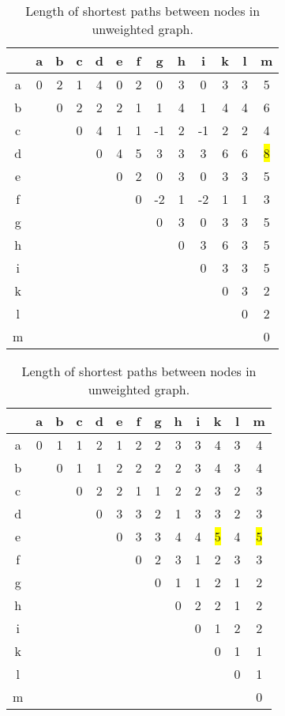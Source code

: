 \documentclass[a4paper,onecolumn,oneside]{article}
\begin{document}
\begin{table}
\begin{subtable}
\centering
\begin{tabular}{c || c c c c c c c c c c c c}
 & a& b& c& d& e& f& g& h& i& k& l& m\\
\hline \hline
a& 0& 2& 1& 4& 0& 2& 0& 3& 0& 3& 3& 5\\
b&  & 0& 2& 2& 2& 1& 1& 4& 1& 4& 4& 6\\
c&  &  & 0& 4& 1& 1&-1& 2&-1& 2& 2& 4\\
d&  &  &  & 0& 4& 5& 3& 3& 3& 6& 6& \colorbox{yellow}{8}\\
e&  &  &  &  & 0& 2& 0& 3& 0& 3& 3& 5\\
f&  &  &  &  &  & 0&-2& 1&-2& 1& 1& 3\\
g&  &  &  &  &  &  & 0& 3& 0& 3& 3& 5\\
h&  &  &  &  &  &  &  & 0& 3& 6& 3& 5\\
i&  &  &  &  &  &  &  &  & 0& 3& 3& 5\\
k&  &  &  &  &  &  &  &  &  & 0& 3& 2\\
l&  &  &  &  &  &  &  &  &  &  & 0& 2\\
m&  &  &  &  &  &  &  &  &  &  &  & 0\\
\end{tabular}
\caption{Length of shortest paths between nodes in weighted graph.}
\label{tbl:weighted-paths}
\end{subtable}
\qquad

\begin{subtable}
\centering
\begin{tabular}{c || c c c c c c c c c c c c}
 & a& b& c& d& e& f& g& h& i& k& l& m\\
\hline \hline
a& 0& 1& 1& 2& 1& 2& 2& 3& 3& 4& 3& 4\\
b&  & 0& 1& 1& 2& 2& 2& 2& 3& 4& 3& 4\\
c&  &  & 0& 2& 2& 1& 1& 2& 2& 3& 2& 3\\
d&  &  &  & 0& 3& 3& 2& 1& 3& 3& 2& 3\\
e&  &  &  &  & 0& 3& 3& 4& 4& \colorbox{yellow}{5}& 4& \colorbox{yellow}{5}\\
f&  &  &  &  &  & 0& 2& 3& 1& 2& 3& 3\\
g&  &  &  &  &  &  & 0& 1& 1& 2& 1& 2\\
h&  &  &  &  &  &  &  & 0& 2& 2& 1& 2\\
i&  &  &  &  &  &  &  &  & 0& 1& 2& 2\\
k&  &  &  &  &  &  &  &  &  & 0& 1& 1\\
l&  &  &  &  &  &  &  &  &  &  & 0& 1\\
m&  &  &  &  &  &  &  &  &  &  &  & 0\\
\end{tabular}
\caption{Length of shortest paths between nodes in unweighted graph.}
\label{tbl:unweighted-paths}
\end{subtable}
\end{table}
\end{document}
